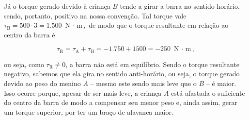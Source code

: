 \begin{exemplo}[Nível I]
Já o torque gerado devido à criança $B$ tende a girar a barra no sentido horário, sendo, portanto, positivo na nossa convenção. Tal torque vale  $\tau_\text{B} = 500 \cdot 3 = 1.500 \text{ N $\cdot$ m},$ de modo que o torque resultante em relação ao centro da barra é

$$ \tau_\text{R} = \tau_\text{A} + \tau_\text{B} = -1.750 + 1500 = -250 \text{ N $\cdot$ m}, $$

\noindent ou seja, como $\tau_\text{R} \neq 0$, a barra não está em equilíbrio. Sendo o torque resultante negativo, sabemos que ela gira no sentido anti-horário, ou seja, o torque gerado devido ao peso do menino $A$ -- mesmo este sendo mais leve que o $B$ -- é maior. Isso ocorre porque, apesar de ser mais leve, a criança $A$ está afastada o suficiente do centro da barra de modo a compensar seu menor peso e, ainda assim, gerar um torque superior, por ter um braço de alavanca maior.

\end{exemplo}


\vspace{0.3cm}



